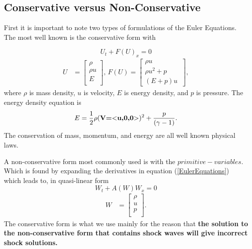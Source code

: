 \documentclass[]{article}
\begin{document}
	\subsection{Conservative versus Non-Conservative}
		First it is important to note two types of formulations of the Euler Equations. The most well known is the conservative form with
		
		\begin{equation}
			U_t + F(U)_x = 0
		\end{equation}
		\begin{align}
			U &= \begin{bmatrix}
			\rho \\
			\rho u \\
			E \\
			\end{bmatrix} \mbox{,  } 
			F(U) = \begin{bmatrix}
			\rho u \\
			\rho u^2 + p \\
			(E+p) u\
			\end{bmatrix},
			\label{EulerEquations}
		\end{align}
		where $ \rho $ is mass density, $ u $ is velocity, $ E $ is energy density, and $ p $ is pressure. The energy density equation is
		\begin{equation}
			E = \frac{1}{2}\rho(\textbf{V=$ < $u,0,0$ > $})^2 + \frac{p}{(\gamma -1)}.
		\end{equation}
		The conservation of mass, momentum, and energy are all well known physical laws. 
		
		A non-conservative form most commonly used is with the $ primitive-variables $. Which is found by expanding the derivatives in equation (\ref{EulerEquations}) which leads to, in quasi-linear form
		\begin{equation}
			W_t + A(W) W_x = 0
		\end{equation}
		\begin{align}
			W &= \begin{bmatrix}
			\rho \\
			u \\
			p \\
			\end{bmatrix}.
			\label{PrimitiveVariables}
		\end{align}	
		The conservative form is what we use mainly for the reason that \textbf{the solution to the non-conservative form that contains shock waves will give incorrect shock solutions.}
		
\end{document}
